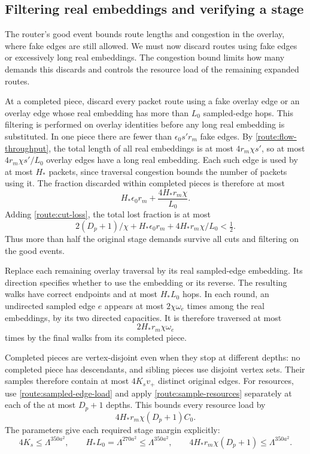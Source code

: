 \subsection{Filtering real embeddings and verifying a stage}

The router's good event bounds route lengths and congestion in the
overlay, where fake edges are still allowed.  We must now discard
routes using fake edges or excessively long real embeddings.  The
congestion bound limits how many demands this discards and controls
the resource load of the remaining expanded routes.

At a completed piece, discard every packet route using a fake
overlay edge or an overlay edge whose real embedding has more than
$L_0$ sampled-edge hops.  This filtering is performed on overlay
identities before any long real embedding is substituted.  In one
piece there are fewer than $\epsilon_0s'r_m$ fake edges.  By
\eqref{route:flow-throughput}, the total length of all real
embeddings is at most $4r_m\chi s'$, so at most
$4r_m\chi s'/L_0$ overlay edges have a long real embedding.
Each such edge is used by at most $H_*$ packets, since traversal
congestion bounds the number of packets using it.  The fraction
discarded within completed pieces is therefore at most
\begin{equation}\label{route:filter-loss}
 H_*\epsilon_0r_m+\frac{4H_*r_m\chi}{L_0}.
\end{equation}
Adding \eqref{route:cut-loss}, the total lost fraction is at most
\[
 2(D_p+1)/\chi+
       H_*\epsilon_0r_m+4H_*r_m\chi/L_0<\tfrac12.
\]
Thus more than half the original stage demands survive all cuts
and filtering on the good events.

Replace each remaining overlay traversal by its real sampled-edge
embedding.  Its direction specifies whether to use the embedding
or its reverse.  The resulting walks have correct endpoints and
at most $H_*L_0$ hops.  In each round, an undirected sampled edge
$e$ appears at most $2\chi\omega_e$ times among the real embeddings,
by its two directed capacities.  It is therefore traversed at most
\begin{equation}\label{route:sampled-edge-load}
 2H_*r_m\chi\omega_e
\end{equation}
times by the final walks from its completed piece.

Completed pieces are vertex-disjoint even when they stop at
different depths: no completed piece has descendants, and sibling
pieces use disjoint vertex sets.  Their samples therefore contain
at most $4K_sv_+$ distinct original edges.  For resources, use
\eqref{route:sampled-edge-load} and apply
\eqref{route:sample-resources} separately at each of the at most
$D_p+1$ depths.  This bounds every resource load by
\begin{equation}\label{route:stage-load}
 4H_*r_m\chi(D_p+1)C_0.
\end{equation}
The parameters give each required stage margin explicitly:
\begin{equation}\label{route:stage-margins}
 4K_s\le\Lambda^{350a^2},\qquad
 H_*L_0=\Lambda^{270a^2}\le\Lambda^{350a^2},\qquad
 4H_*r_m\chi(D_p+1)\le\Lambda^{350a^2}.
\end{equation}

